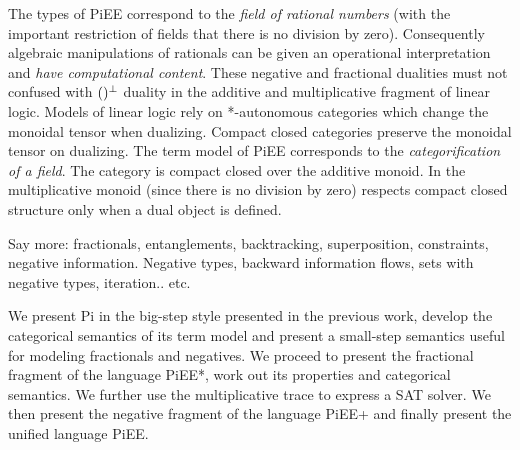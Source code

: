 \documentclass[preprint]{sigplanconf}
\begin{document}
The types of {{PiEE}} correspond to the \emph{field of rational
  numbers} (with the important restriction of fields that there is no
division by zero). Consequently algebraic manipulations of rationals
can be given an operational interpretation and \emph{have
  computational content}.  These negative and fractional dualities
must not confused with $(\-)^\bot$ duality in the additive and
multiplicative fragment of linear logic.  Models of linear logic rely
on *-autonomous categories which change the monoidal tensor when
dualizing. Compact closed categories preserve the monoidal tensor on
dualizing.  The term model of {{PiEE}} corresponds to the
\emph{categorification of a field}. The category is compact closed
over the additive monoid. In the multiplicative monoid (since there is
no division by zero) respects compact closed structure only when a
dual object is defined.


Say more: fractionals, entanglements, backtracking, superposition,
constraints, negative information. Negative types, backward information
flows, sets with negative types, iteration.. etc.


We present {{Pi}} in the big-step style presented in the previous
work, develop the categorical semantics of its term model and present
a small-step semantics useful for modeling fractionals and
negatives. We proceed to present the fractional fragment of the
language {{PiEE*}}, work out its properties and categorical
semantics. We further use the multiplicative {{trace}} to express a
SAT solver. We then present the negative fragment of the language
{{PiEE+}} and finally present the unified language {{PiEE}}.




\end{document}
